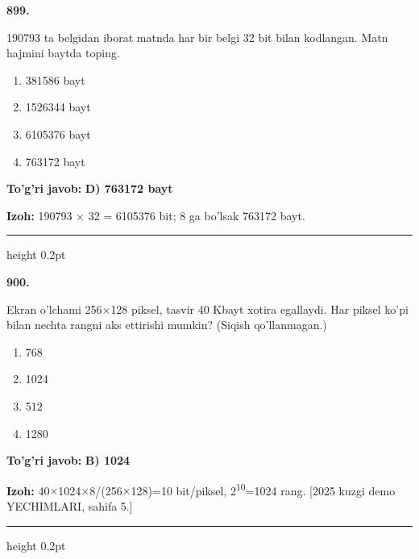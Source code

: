 \documentclass[10pt,a4paper,oneside]{article}
\begin{document}
\noindent\textbf{\color{ink}899.}
\par
190793 ta belgidan iborat matnda har bir belgi 32 bit bilan kodlangan. Matn hajmini baytda toping.
\begin{enumerate}[label=\Alph*),leftmargin=9mm]
\item 381586 bayt
\item 1526344 bayt
\item 6105376 bayt
\item 763172 bayt
\end{enumerate}
\begin{tcolorbox}[enhanced,breakable,colback=teal!4,colframe=teal!50!black,boxrule=0.5pt,arc=1.1mm,left=3mm,right=3mm,top=1.7mm,bottom=1.7mm,before skip=2mm,after skip=2mm]
\textbf{\color{teal}To'g'ri javob:} \textbf{D) 763172 bayt}
\par\smallskip
\textbf{Izoh:} 190793 \ensuremath{\times} 32 = 6105376 bit; 8 ga bo'lsak 763172 bayt.
\end{tcolorbox}
\vspace{2mm}\hrule height 0.2pt \vspace{3mm}

\noindent\textbf{\color{ink}900.}
\par
Ekran o'lchami 256\ensuremath{\times}128 piksel, tasvir 40 Kbayt xotira egallaydi. Har piksel ko'pi bilan nechta rangni aks ettirishi mumkin? (Siqish qo'llanmagan.)
\begin{enumerate}[label=\Alph*),leftmargin=9mm]
\item 768
\item 1024
\item 512
\item 1280
\end{enumerate}
\begin{tcolorbox}[enhanced,breakable,colback=teal!4,colframe=teal!50!black,boxrule=0.5pt,arc=1.1mm,left=3mm,right=3mm,top=1.7mm,bottom=1.7mm,before skip=2mm,after skip=2mm]
\textbf{\color{teal}To'g'ri javob:} \textbf{B) 1024}
\par\smallskip
\textbf{Izoh:} 40\ensuremath{\times}1024\ensuremath{\times}8/(256\ensuremath{\times}128)=10 bit/piksel, 2\textsuperscript{1}\textsuperscript{0}=1024 rang. [2025 kuzgi demo YECHIMLARI, sahifa 5.]
\end{tcolorbox}
\vspace{2mm}\hrule height 0.2pt \vspace{3mm}
\end{document}

